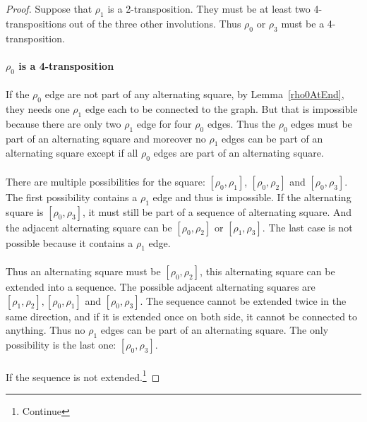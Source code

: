 \begin{proof}
  Suppose that $\rho_1$ is a 2-transposition. They must be at least two 4-transpositions out of the three other involutions. Thus $\rho_0$ or $\rho_3$ must be a 4-transposition.

  \paragraph{}
  \textbf{$\rho_0$ is a 4-transposition}

  \paragraph{}
  If the $\rho_0$ edge are not part of any alternating square, by Lemma~\ref{rho0AtEnd}, they needs one $\rho_1$ edge each to be connected to the graph. But that is impossible because there are only two $\rho_1$ edge for four $\rho_0$ edges. Thus the $\rho_0$ edges must be part of an alternating square and moreover no $\rho_1$ edges can be part of an alternating square except if all $\rho_0$ edges are part of an alternating square.

  \paragraph{}
  There are multiple possibilities for the square: $[\rho_0, \rho_1]$, $[\rho_0, \rho_2]$ and $[\rho_0, \rho_3]$. The first possibility contains a $\rho_1$ edge and thus is impossible. If the alternating square is $[\rho_0, \rho_3]$, it must still be part of a sequence of alternating square. And the adjacent alternating square can be $[\rho_0, \rho_2]$ or $[\rho_1, \rho_3]$. The last case is not possible because it contains a $\rho_1$ edge.

  \paragraph{}
  Thus an alternating square must be $[\rho_0, \rho_2]$, this alternating square can be extended into a sequence. The possible adjacent alternating squares are $[\rho_1, \rho_2], [\rho_0, \rho_1]$ and $[\rho_0, \rho_3]$. The sequence cannot be extended twice in the same direction, and if it is extended once on both side, it cannot be connected to anything. Thus no $\rho_1$ edges can be part of an alternating square. The only possibility is the last one: $[\rho_0, \rho_3]$.

  \paragraph{}
  If the sequence is not extended.\footnote{Continue}


\end{proof}
